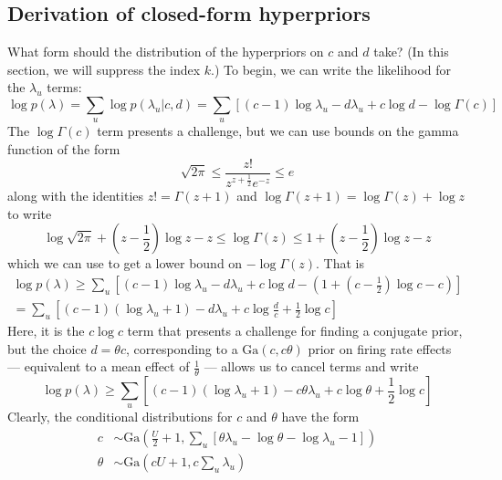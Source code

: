 \documentclass[11pt]{article}
\begin{document}
\subsection{Derivation of closed-form hyperpriors}
What form should the distribution of the hyperpriors on $c$ and $d$ take? (In this section, we will suppress the index $k$.) To begin, we can write the likelihood for the $\lambda_u$ terms:
\begin{equation}
    \log p(\lambda) = \sum_u \log p(\lambda_u|c, d) = \sum_u \left[
    (c - 1) \log \lambda_u - d\lambda_u + c \log d - \log \Gamma(c)
    \right]
\end{equation}
The $\log \Gamma(c)$ term presents a challenge, but we can use bounds on the gamma function of the form
\begin{equation}
    \sqrt{2\pi} \le \frac{z!}{z^{z+\frac{1}{2}} e^{-z}} \le e
\end{equation}
along with the identities $z! = \Gamma(z + 1)$ and $\log \Gamma(z + 1) = \log \Gamma (z) + \log z$ to write
\begin{equation}
    \log \sqrt{2\pi} + \left(z - \frac{1}{2}\right)\log z - z \le
    \log \Gamma (z) \le 1 + \left(z - \frac{1}{2}\right) \log z - z
\end{equation}
which we can use to get a lower bound on $-\log \Gamma (z)$. That is
\begin{multline}
    \log p(\lambda) \ge \sum_u \left[
    (c - 1) \log \lambda_u - d\lambda_u + c \log d -
    \left(1 + \left(c - \frac{1}{2}\right) \log c - c\right)
    \right] \\
    = \sum_u \left[
    (c - 1) (\log \lambda_u + 1) - d\lambda_u + c \log \frac{d}{c} +
    \frac{1}{2} \log c
    \right]
\end{multline}
Here, it is the $c\log c$ term that presents a challenge for finding a conjugate prior, but the choice $d = \theta c$, corresponding to a $\mathrm{Ga}(c, c\theta)$ prior on firing rate effects --- equivalent to a mean effect of $\frac{1}{\theta}$ --- allows us to cancel terms and write
\begin{equation}
    \label{plambda}
    \log p(\lambda) \ge \sum_u \left[
    (c - 1) (\log \lambda_u + 1) - c\theta\lambda_u + c \log \theta + \frac{1}{2}\log c\right]
\end{equation}
Clearly, the conditional distributions for $c$ and $\theta$ have the form
\begin{align}
    c &\sim \mathrm{Ga}\left(\frac{U}{2} + 1, \sum_u \left[
    \theta\lambda_{u} - \log \theta - \log \lambda_{u} - 1
    \right]\right) \\
    \theta &\sim \mathrm{Ga}\left(
    cU + 1, c \sum_u \lambda_u
    \right)
\end{align}
\end{document}
